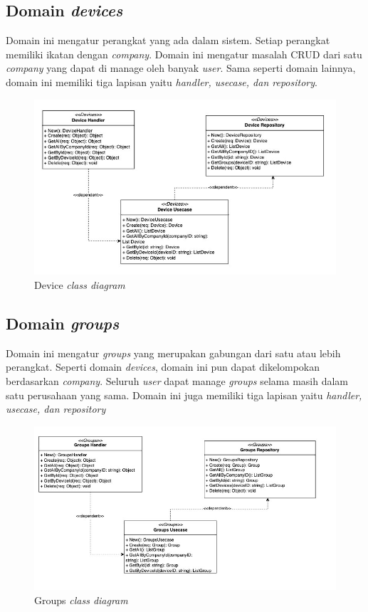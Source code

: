 \subsection{Domain \textit{devices}}

Domain ini mengatur perangkat yang ada dalam sistem. Setiap perangkat memiliki ikatan dengan \textit{company}. Domain ini mengatur masalah CRUD dari satu \textit{company} yang dapat di manage oleh banyak \textit{user}. Sama seperti domain lainnya, domain ini memiliki tiga lapisan yaitu \textit{handler, usecase, dan repository}.

\begin{figure}[h]
  \centering
  \includegraphics[width=1\textwidth]{resources/chapter-3/class/device-class-diagram.jpg}
  \caption{Device \textit{class diagram}}
  \label{fig:device-class-diagram}
\end{figure}

\subsection{Domain \textit{groups}}

Domain ini mengatur \textit{groups} yang merupakan gabungan dari satu atau lebih perangkat. Seperti domain \textit{devices}, domain ini pun dapat dikelompokan berdasarkan \textit{company}. Seluruh \textit{user} dapat manage \textit{groups} selama masih dalam satu perusahaan yang sama. Domain ini juga memiliki tiga lapisan yaitu \textit{handler, usecase, dan repository}

\begin{figure}[h]
  \centering
  \includegraphics[width=1\textwidth]{resources/chapter-3/class/groups-class-diagram.jpg}
  \caption{Groups \textit{class diagram}}
  \label{fig:groups-class-diagram}
\end{figure}

